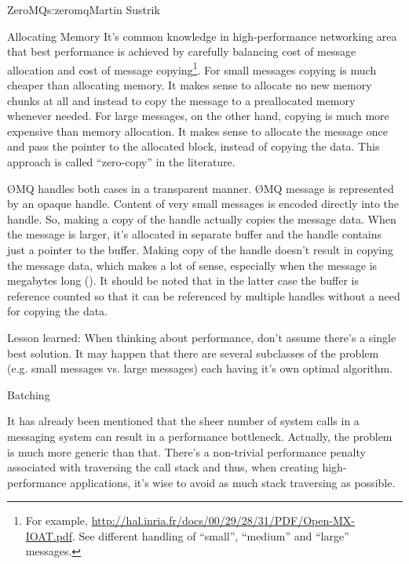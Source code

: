 \begin{aosachapter}{ZeroMQ}{s:zeromq}{Martin Sustrik}
\begin{aosasect1}{Allocating Memory}
It's common knowledge in high-performance networking area that best
performance is achieved by carefully balancing cost of message
allocation and cost of message copying\footnote{For example,
  \url{http://hal.inria.fr/docs/00/29/28/31/PDF/Open-MX-IOAT.pdf}.
  See different handling of ``small'', ``medium'' and ``large''
  messages.}. For small messages copying is much cheaper than
allocating memory. It makes sense to allocate no new memory chunks at
all and instead to copy the message to a preallocated memory whenever
needed. For large messages, on the other hand, copying is much more
expensive than memory allocation. It makes sense to allocate the
message once and pass the pointer to the allocated block, instead of
copying the data. This approach is called ``zero-copy'' in the
literature.

ØMQ handles both cases in a transparent manner. ØMQ message is
represented by an opaque handle. Content of very small messages is
encoded directly into the handle. So, making a copy of the handle
actually copies the message data. When the message is larger, it's
allocated in separate buffer and the handle contains just a pointer to
the buffer. Making copy of the handle doesn't result in copying the
message data, which makes a lot of sense, especially when the message
is megabytes long (). It should be noted
that in the latter case the buffer is reference counted so that it can
be referenced by multiple handles without a need for copying the data.


Lesson learned: When thinking about performance, don't assume there's
a single best solution. It may happen that there are several
subclasses of the problem (e.g. small messages vs. large messages)
each having it's own optimal algorithm.

\end{aosasect1}

\begin{aosasect1}{Batching}

It has already been mentioned that the sheer number of system calls in
a messaging system can result in a performance bottleneck. Actually,
the problem is much more generic than that. There's a non-trivial
performance penalty associated with traversing the call stack and
thus, when creating high-performance applications, it's wise to avoid
as much stack traversing as possible.



\end{aosasect1}
\end{aosachapter}
